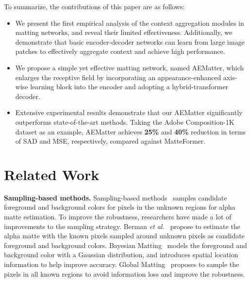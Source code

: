 \documentclass[10pt,twocolumn,letterpaper]{article}
\begin{document}
To summarize, the contributions of this paper are as follows:



\begin{itemize}
    \item We present the first empirical analysis of the context aggregation modules in matting networks, and reveal their limited effectiveness.
Additionally, we demonstrate that basic encoder-decoder networks can learn from large image patches to effectively aggregate context and achieve high performance.

    \item  We propose a simple yet effective matting network, named AEMatter, which enlarges the receptive field by incorporating an appearance-enhanced axis-wise learning block into the encoder and adopting a hybrid-transformer decoder.
    
    \item   Extensive experimental results demonstrate that our AEMatter significantly outperforms state-of-the-art methods.
    Taking the Adobe Composition-1K dataset as an example, AEMatter achieves \textbf{25\%} and \textbf{40\%} reduction in terms of SAD and MSE, respectively, compared against MatteFormer.
\end{itemize}

\section{Related Work}
\noindent \textbf{Sampling-based methods.}
Sampling-based methods~\cite{berman1998method,ruzon2000alpha,wang2007optimized,gastal2010shared,he2011a,shahrian2013improving} samples candidate foreground and background colors for pixels in the unknown regions for alpha matte estimation.
To improve the robustness, researchers have made a lot of improvements to the sampling strategy.
Berman \emph{et al.}~\cite{berman1998method} propose to estimate the alpha matte with the known pixels sampled around unknown pixels as candidate foreground and background colors.
Bayesian Matting~\cite{chuang2001a} models the foreground and background color with a Gaussian distribution, and introduces spatial location information to help improve accuracy.
Global Matting~\cite{he2011a} proposes to sample the pixels in all known regions to avoid information loss and improve the robustness.
\end{document}
